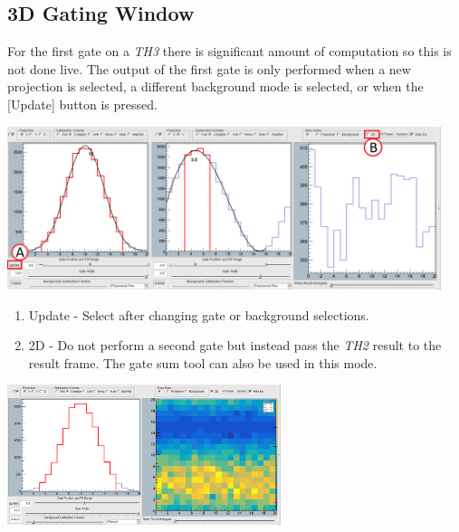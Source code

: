 \documentclass[a4paper,10pt]{article}
\begin{document}
\subsection{3D Gating Window}
For the first gate on a \textit{TH3} there is significant amount of computation so this is not done live. The output of the first gate is only performed when a new projection is selected, a different background mode is selected, or when the [Update] button is pressed.
\begin{center}
\includegraphics[width=0.95\textwidth]{toolE.png}
\begin{enumerate}
\item Update - Select after changing gate or background selections.
\item 2D - Do not perform a second gate but instead pass the \textit{TH2} result to the result frame. The gate sum tool can also be used in this mode.
\end{enumerate}
\includegraphics[width=0.6\textwidth]{toolF.png}
\end{center}

\newpage
\end{document}
